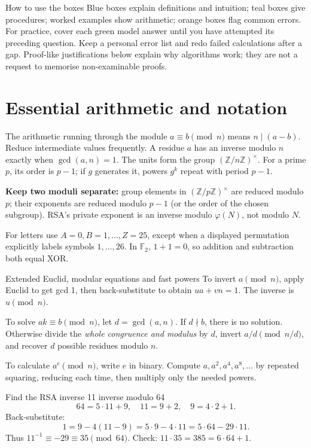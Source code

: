 \documentclass[11pt,a4paper]{article}
\newcommand{\F}{\mathbb F}\newcommand{\Z}{\mathbb Z}
\begin{document}
\begin{concept}{How to use the boxes}
Blue boxes explain definitions and intuition; teal boxes give procedures; worked examples show arithmetic; orange boxes flag common errors. For practice, cover each green model answer until you have attempted its preceding question. Keep a personal error list and redo failed calculations after a gap. Proof-like justifications below explain why algorithms work; they are not a request to memorise non-examinable proofs.
\end{concept}
\tableofcontents\clearpage
\section{Essential arithmetic and notation}
\begin{concept}{The arithmetic running through the module}
\(a\equiv b\pmod n\) means \(n\mid(a-b)\). Reduce intermediate values frequently. A residue \(a\) has an inverse modulo \(n\) exactly when \(\gcd(a,n)=1\). The units form the group \((\Z/n\Z)^\times\). For a prime \(p\), its order is \(p-1\); if \(g\) generates it, powers \(g^k\) repeat with period \(p-1\).

\textbf{Keep two moduli separate:} group elements in \((\Z/p\Z)^\times\) are reduced modulo \(p\); their exponents are reduced modulo \(p-1\) (or the order of the chosen subgroup). RSA's private exponent is an inverse modulo \(\varphi(N)\), not modulo \(N\).

For letters use \(A=0,B=1,\ldots,Z=25\), except when a displayed permutation explicitly labels symbols \(1,\ldots,26\). In \(\F_2\), \(1+1=0\), so addition and subtraction both equal XOR.
\end{concept}
\begin{method}{Extended Euclid, modular equations and fast powers}
To invert \(a\pmod n\), apply Euclid to get gcd 1, then back-substitute to obtain \(ua+vn=1\). The inverse is \(u\pmod n\).

To solve \(ak\equiv b\pmod n\), let \(d=\gcd(a,n)\). If \(d\nmid b\), there is no solution. Otherwise divide the \emph{whole congruence and modulus} by \(d\), invert \(a/d\pmod{n/d}\), and recover \(d\) possible residues modulo \(n\).

To calculate \(a^e\pmod n\), write \(e\) in binary. Compute \(a,a^2,a^4,a^8,\ldots\) by repeated squaring, reducing each time, then multiply only the needed powers.
\end{method}
\begin{example}{Find the RSA inverse 11 inverse modulo 64}
\[64=5\cdot11+9,\quad11=9+2,\quad9=4\cdot2+1.\]
Back-substitute:
\[1=9-4(11-9)=5\cdot9-4\cdot11=5\cdot64-29\cdot11.\]
Thus \(11^{-1}\equiv-29\equiv35\pmod{64}\). Check: \(11\cdot35=385=6\cdot64+1\).
\end{example}
\end{document}
